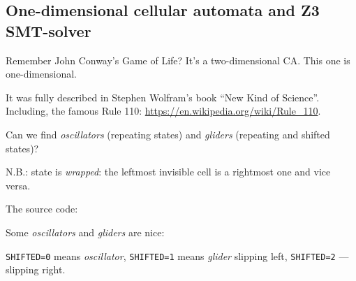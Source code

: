 \subsection{One-dimensional cellular automata and Z3 SMT-solver}

Remember John Conway's Game of Life? It's a two-dimensional CA.
This one is one-dimensional.

It was fully described in Stephen Wolfram's book ``New Kind of Science''.
Including, the famous Rule 110: \url{https://en.wikipedia.org/wiki/Rule_110}.

Can we find \textit{oscillators} (repeating states) and \textit{gliders} (repeating and shifted states)?

N.B.: state is \textit{wrapped}: the leftmost invisible cell is a rightmost one and vice versa.

The source code: 



Some \textit{oscillators} and \textit{gliders} are nice: 



\verb|SHIFTED=0| means \textit{oscillator}, \verb|SHIFTED=1| means \textit{glider} slipping left,
\verb|SHIFTED=2| --- slipping right.

